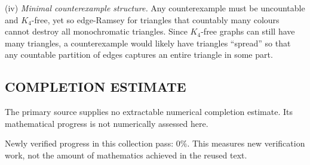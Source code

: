 (iv) \emph{Minimal counterexample structure.}
Any counterexample must be uncountable and $K_4$-free, yet so edge-Ramsey for triangles that countably many colours cannot destroy all monochromatic triangles.
Since $K_4$-free graphs can still have many triangles, a counterexample would likely have triangles ``spread'' so that any countable partition of edges captures an entire triangle in some part.




\subsection*{COMPLETION ESTIMATE}
The primary source supplies no extractable numerical completion estimate. Its mathematical progress is not numerically assessed here.

Newly verified progress in this collection pass: $0\%$. This measures new verification work, not the amount of mathematics achieved in the reused text.
